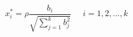 

\[
x_{i}^{*} = \rho \frac{b_i}{\sqrt{\sum_{j=1}^{k}{b_{j}^{2}}}} \;\;\;\;\; i = 1, 2, ..., k

\]


